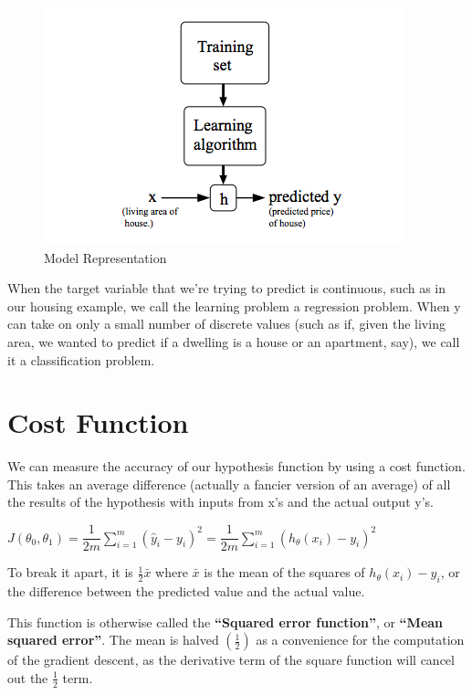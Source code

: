 \documentclass[
]{book}
\begin{document}
\begin{figure}
\centering
\includegraphics{Model_representation.png}
\caption{Model Representation}
\end{figure}

When the target variable that we're trying to predict is continuous, such as in
our housing example, we call the learning problem a regression problem. When y
can take on only a small number of discrete values (such as if, given the living
area, we wanted to predict if a dwelling is a house or an apartment, say), we
call it a classification problem.

\hypertarget{cost-function}{%
\section{Cost Function}\label{cost-function}}

We can measure the accuracy of our hypothesis function by using a cost function.
This takes an average difference (actually a fancier version of an average) of
all the results of the hypothesis with inputs from x's and the actual output y's.

\(J(\theta_0, \theta_1) = \dfrac {1}{2m} \displaystyle \sum _{i=1}^m \left ( \hat{y}_{i}- y_{i} \right)^2 = \dfrac {1}{2m} \displaystyle \sum _{i=1}^m \left (h_\theta (x_{i}) - y_{i} \right)^2\)

To break it apart, it is \(\frac{1}{2} \bar{x}\) where \(\bar{x}\) is the mean of the
squares of \(h_\theta (x_{i}) - y_{i}\), or the difference between the predicted
value and the actual value.

This function is otherwise called the \textbf{``Squared error function''}, or \textbf{``Mean squared error''}. The mean is halved \(\left(\frac{1}{2}\right)\) as a convenience for the
computation of the gradient descent, as the derivative term of the square function
will cancel out the \(\frac{1}{2}\) term.
\end{document}
